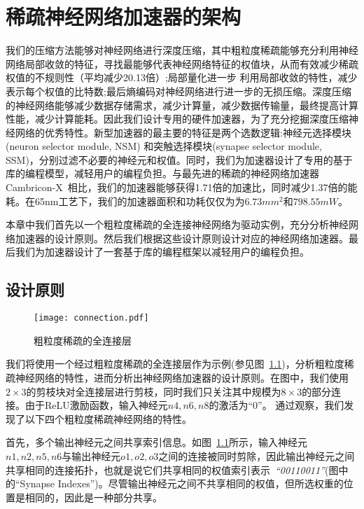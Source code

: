\chapter{稀疏神经网络加速器的架构}

我们的压缩方法能够对神经网络进行深度压缩，其中粗粒度稀疏能够充分利用神经网络局部收敛的特征，寻找最能够代表神经网络特征的权值块，从而有效减少稀疏权值的不规则性（平均减少20.13倍）;局部量化进一步
利用局部收敛的特性，减少表示每个权值的比特数;最后熵编码对神经网络进行进一步的无损压缩。深度压缩的神经网络能够减少数据存储需求，减少计算量，减少数据传输量，最终提高计算性能，减少计算能耗。因此我们设计专用的硬件加速器，为了充分挖掘深度压缩神经网络的优秀特性。新型加速器的最主要的特征是两个选数逻辑:神经元选择模块 (neuron selector module, NSM) 和突触选择模块(synapse selector module, SSM)，分别过滤不必要的神经元和权值。同时，我们为加速器设计了专用的基于库的编程模型，减轻用户的编程负担。与最先进的稀疏的神经网络加速器Cambricon-X~\cite{zhang2016cambricon}相比，我们的加速器能够获得1.71倍的加速比，同时减少1.37倍的能耗。在65nm工艺下，我们的加速器面积和功耗仅仅为为$6.73mm^2$和$798.55mW$。

本章中我们首先以一个粗粒度稀疏的全连接神经网络为驱动实例，充分分析神经网络加速器的设计原则。然后我们根据这些设计原则设计对应的神经网络加速器。最后我们为加速器设计了一套基于库的编程框架以减轻用户的编程负担。

\section{设计原则}
\label{sec:principle}

\begin{figure}[ht]
\centering
\texttt{[image: connection.pdf]}
\caption{粗粒度稀疏的全连接层}
\label{fig:connection}
\end{figure}

我们将使用一个经过粗粒度稀疏的全连接层作为示例(参见图~\ref{fig:connection})，分析粗粒度稀疏神经网络的特性，进而分析出神经网络加速器的设计原则。在图中，我们使用$2\times 3$的剪枝块对全连接层进行剪枝，同时我们只关注其中规模为$8\times 3$的部分连接。由于ReLU激励函数，输入神经元$n4, n6, n8$的激活为“0”。
通过观察，我们发现了以下四个粗粒度稀疏神经网络的特性。

首先，多个输出神经元之间共享索引信息。如图~\ref{fig:connection}所示，输入神经元$n1, n2, n5, n6$与输出神经元$o1, o2, o3$之间的连接被同时剪除，因此输出神经元之间共享相同的连接拓扑，也就是说它们共享相同的权值索引表示~\emph{“00110011”}(图中的“Synapse Indexes”)。尽管输出神经元之间不共享相同的权值，但所选权重的位置是相同的，因此是一种部分共享。

